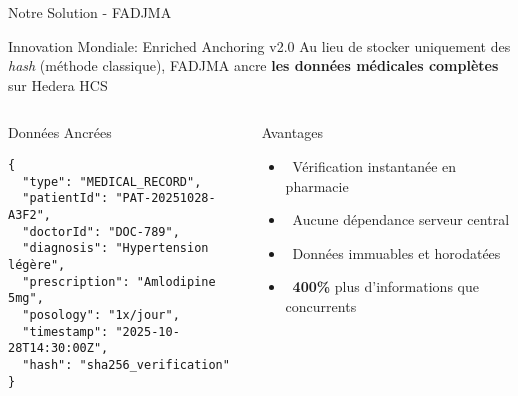 \documentclass[aspectratio=169,11pt]{beamer}
\newcommand{\checkmark}{\textcolor{successGreen}{\faCheckCircle}}
\begin{document}
\begin{frame}{Notre Solution - FADJMA}

\begin{block}{Innovation Mondiale: Enriched Anchoring v2.0}
Au lieu de stocker uniquement des \textit{hash} (méthode classique), FADJMA ancre \textbf{les données médicales complètes} sur Hedera HCS
\end{block}

\vspace{0.3cm}

\begin{columns}[T]
\begin{exampleblock}{Données Ancrées}
\tiny
\begin{verbatim}
{
  "type": "MEDICAL_RECORD",
  "patientId": "PAT-20251028-A3F2",
  "doctorId": "DOC-789",
  "diagnosis": "Hypertension légère",
  "prescription": "Amlodipine 5mg",
  "posology": "1x/jour",
  "timestamp": "2025-10-28T14:30:00Z",
  "hash": "sha256_verification"
}
\end{verbatim}
\end{exampleblock}

\begin{block}{Avantages}
\begin{itemize}
    \item \checkmark~Vérification instantanée en pharmacie
    \item \checkmark~Aucune dépendance serveur central
    \item \checkmark~Données immuables et horodatées
    \item \checkmark~\textbf{400\%} plus d'informations que concurrents
\end{itemize}
\end{block}
\end{columns}

\end{frame}
\end{document}
